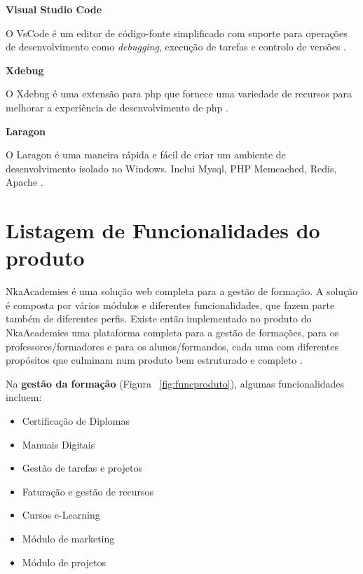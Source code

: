 \textbf{Visual Studio Code}

O VsCode é um editor de código-fonte simplificado com suporte para operações de desenvolvimento como \textit{debugging}, execução de tarefas e controlo de versões \citep{vscode}.\newpage %

\quad \textbf{Xdebug}

\quad O Xdebug é uma extensão para \acrshort{php} que fornece uma variedade de recursos para melhorar a experiência de desenvolvimento de \acrshort{php} \citep{xdebug}.\newline


\textbf{Laragon}

O Laragon é uma maneira rápida e fácil de criar um ambiente de desenvolvimento isolado no Windows. Inclui Mysql, PHP Memcached, Redis, Apache \citep{laragon}.\newline

\section{Listagem de Funcionalidades do produto}

NkaAcademies é uma solução web completa para a gestão de formação.
A solução é composta por vários módulos e diferentes funcionalidades, que fazem parte também de diferentes perfis. Existe então implementado no produto do NkaAcademies uma plataforma completa para a gestão de formações, para os professores/formadores e para os alunos/formandos, cada uma com diferentes propósitos que culminam num produto bem estruturado e completo \citep{nka1}.

Na \textbf{gestão da formação} (Figura ~\ref{fig:funcproduto}), algumas funcionalidades incluem:
\begin{itemize}
  \setlength\itemsep{-0.5em}
  \item Certificação de Diplomas
  \item Manuais Digitais
  \item Gestão de tarefas e projetos
  \item Faturação e gestão de recursos
  \item Cursos e-Learning
  \item Módulo de marketing
  \item Módulo de projetos
\end{itemize}

